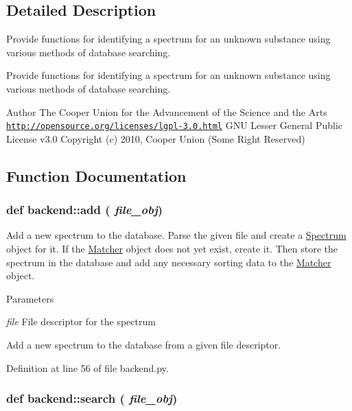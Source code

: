 \subsection{Detailed Description}
Provide functions for identifying a spectrum for an unknown substance using various methods of database searching. \begin{DoxyVerb}Provide functions for identifying a spectrum for an unknown substance using
various methods of database searching.\end{DoxyVerb}


\begin{DoxyAuthor}{Author}
The Cooper Union for the Advancement of the Science and the Arts  \href{http://opensource.org/licenses/lgpl-3.0.html}{\tt http://opensource.org/licenses/lgpl-\/3.0.html} GNU Lesser General Public License v3.0  Copyright (c) 2010, Cooper Union (Some Right Reserved) 
\end{DoxyAuthor}


\subsection{Function Documentation}
\hypertarget{namespacebackend_a31148baaaad7ef57779210d868d99ad7}{
\subsubsection[{add}]{\setlength{\rightskip}{0pt plus 5cm}def backend::add ( {\em file\_\-obj})}}
\label{namespacebackend_a31148baaaad7ef57779210d868d99ad7}


Add a new spectrum to the database. Parse the given file and create a \hyperlink{classbackend_1_1_spectrum}{Spectrum} object for it. If the \hyperlink{classbackend_1_1_matcher}{Matcher} object does not yet exist, create it. Then store the spectrum in the database and add any necessary sorting data to the \hyperlink{classbackend_1_1_matcher}{Matcher} object.


\begin{DoxyParams}{Parameters}
\item[{\em file}]File descriptor for the spectrum\begin{DoxyVerb}Add a new spectrum to the database from a given file descriptor.\end{DoxyVerb}
 \end{DoxyParams}


Definition at line 56 of file backend.py.\hypertarget{namespacebackend_af7a9bbf936ca6c76342679bb4a3509cd}{
\subsubsection[{search}]{\setlength{\rightskip}{0pt plus 5cm}def backend::search ( {\em file\_\-obj})}}
\label{namespacebackend_af7a9bbf936ca6c76342679bb4a3509cd}


